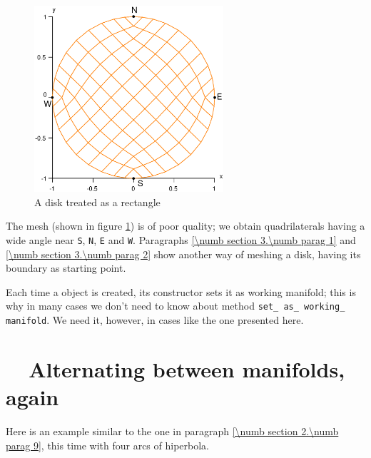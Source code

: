 \begin{figure}[ht] \centering
  \includegraphics[width=70mm]{disk}
  \caption{A disk treated as a rectangle}
  \label{\numb section 2.\numb fig 9}
\end{figure}

The mesh (shown in figure \ref{\numb section 2.\numb fig 9}) is of poor quality;
we obtain quadrilaterals having a wide angle near {\small\tt S}, {\small\tt N}, {\small\tt E}
and {\small\tt W}.
Paragraphs \ref{\numb section 3.\numb parag 1} and \ref{\numb section 3.\numb parag 2} show
another way of meshing a disk, having its boundary as starting point.

Each time a {\small\tt {}} object is created, its constructor sets it as working manifold;
this is why in many cases we don't need to know about method
{\small\tt set\_\,as\_\,working\_\,manifold}.
We need it, however, in cases like the one presented here.


\section{~~Alternating between manifolds, again}\label{\numb section 2.\numb parag 10}

Here is an example similar to the one in paragraph \ref{\numb section 2.\numb parag 9},
this time with four arcs of hiperbola.

